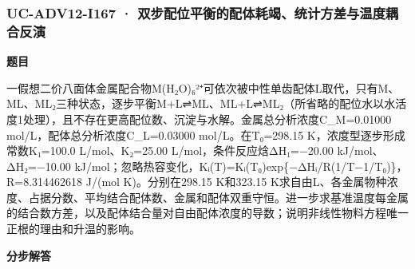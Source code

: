 \documentclass[UTF8,11pt,a4paper]{ctexart}
\begin{document}
\subsubsection*{UC-ADV12-I167 · 双步配位平衡的配体耗竭、统计方差与温度耦合反演}
\noindent\textbf{题目}\par
一假想二价八面体金属配合物M(H₂O)₆²⁺可依次被中性单齿配体L取代，只有M、ML、ML₂三种状态，逐步平衡M+L⇌ML、ML+L⇌ML₂（所省略的配位水以水活度1处理），且不存在更高配位数、沉淀与水解。金属总分析浓度C\_M=0.01000 mol/L，配体总分析浓度C\_L=0.03000 mol/L。在T₀=298.15 K，浓度型逐步形成常数K₁=100.0 L/mol、K₂=25.00 L/mol，条件反应焓ΔH₁=−20.00 kJ/mol、ΔH₂=−10.00 kJ/mol；忽略热容变化，Kᵢ(T)=Kᵢ(T₀)exp\{−ΔHᵢ/R(1/T−1/T₀)\}，R=8.314462618 J/(mol K)。分别在298.15 K和323.15 K求自由L、各金属物种浓度、占据分数、平均结合配体数、金属和配体双重守恒。进一步求基准温度每金属的结合数方差，以及配体结合量对自由配体浓度的导数；说明非线性物料方程唯一正根的理由和升温的影响。\par
\medskip\noindent\textbf{分步解答}
\end{document}
